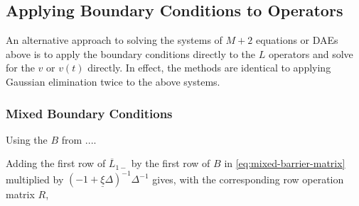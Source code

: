 \documentclass[11pt]{article}
\theoremstyle{definition}
\begin{document}
\subsection{Applying Boundary Conditions to Operators}

An alternative approach to solving the systems of $M+2$ equations or DAEs above is to apply the boundary conditions directly to the $L$ operators and solve for the $v$ or $v(t)$ directly.  In effect, the methods are identical to applying Gaussian elimination twice to the above systems.

\subsubsection{Mixed Boundary Conditions}
Using the $B$ from ....

Adding the first row of $\overline{L}_{1-}$ by the first row of $B$ in \eqref{eq:mixed-barrier-matrix} multiplied by $(-1 + \underline{\xi} \Delta )^{-1}\Delta^{-1}$ gives, with the corresponding row operation matrix $R$,
\end{document}
